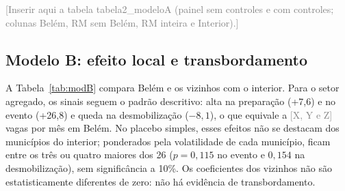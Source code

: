 \documentclass[12pt,a4paper]{article}
\newcommand{\afazer}[1]{\textcolor{gray}{[#1]}}
\begin{document}
\begin{table}[H]
\centering\small
\caption{Modelo A: efeito por fase e grupo (MQO, erros de Newey-West)}\label{tab:modA}
\afazer{Inserir aqui a tabela tabela2\_modeloA (painel sem controles e com controles; colunas Belém,
RM sem Belém, RM inteira e Interior).}
\end{table}

\subsection{Modelo B: efeito local e transbordamento}

A Tabela~\ref{tab:modB} compara Belém e os vizinhos com o interior. Para o setor agregado, os sinais
seguem o padrão descritivo: alta na preparação (+7,6) e no evento (+26,8) e queda na desmobilização
($-8{,}1$), o que equivale a \afazer{X, Y e Z} vagas por mês em Belém. No placebo simples, esses efeitos
não se destacam dos municípios do interior; ponderados pela volatilidade de cada município, ficam entre
os três ou quatro maiores dos 26 ($p = 0{,}115$ no evento e $0{,}154$ na desmobilização), sem
significância a 10\%. Os coeficientes dos vizinhos não são estatisticamente diferentes de zero: não há
evidência de transbordamento.
\end{document}
